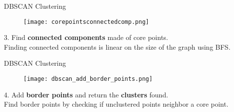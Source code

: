\documentclass[aspectratio=169]{beamer}
\begin{document}
\begin{frame}{DBSCAN Clustering}
    \begin{minipage}[c]{0.55\textwidth}
        \begin{figure}
            \centering
            \texttt{[image: corepointsconnectedcomp.png]}
        \end{figure}
    \end{minipage}
    \hfill
    \begin{minipage}[c]{0.44\textwidth}
        {\color{gray}3. Find \textbf{connected components} made of core points.}\\
        Finding connected components is linear on the size of the graph using BFS.
    \end{minipage}
\end{frame}

\begin{frame}{DBSCAN Clustering}
    \begin{minipage}[c]{0.55\textwidth}
        \begin{figure}
            \centering
            \texttt{[image: dbscan\_add\_border\_points.png]}
        \end{figure}
    \end{minipage}
    \hfill
    \begin{minipage}[c]{0.44\textwidth}
        {\color{gray}4. Add \textbf{border points} and return the \textbf{clusters} found.}\\
        Find border points by checking if unclustered points neighbor a core point.
    \end{minipage}
\end{frame}
\end{document}
